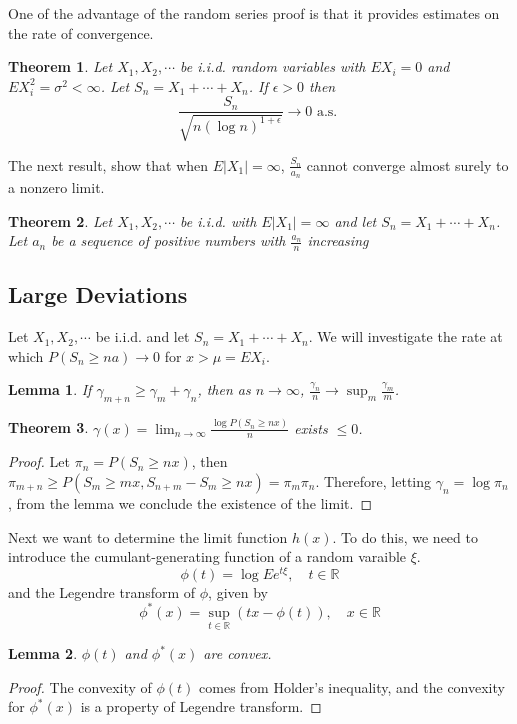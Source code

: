 \documentclass{article}
\newtheorem{Thm}{Theorem}[section]
\newtheorem{Lem}{Lemma}[section]
\theoremstyle{definition}
\begin{document}
One of the advantage of the random series proof is that it provides estimates on the rate of convergence.
\begin{Thm}
    Let $X_1,X_2,\cdots$ be i.i.d. random variables with $EX_i=0$ and $EX_i^2=\sigma^2<\infty$. Let $S_n=X_1+\cdots+X_n$. If $\epsilon>0$ then 
    \[\frac{S_n}{\sqrt{n(\log n)^{1+\epsilon}}}\to 0\text{ a.s. }\]
\end{Thm}

The next result, show that when $E\left|X_1\right|=\infty$, $\frac{S_n}{a_n}$ cannot converge almost surely to a nonzero limit.
\begin{Thm}
    Let $X_1,X_2,\cdots$ be i.i.d. with $E\left|X_1\right|=\infty$ and let $S_n=X_1+\cdots+X_n$.
    Let $a_n$ be a sequence of positive numbers with $\frac{a_n}{n}$ increasing
\end{Thm}

\subsection{Large Deviations}
Let $X_1,X_2,\cdots$ be i.i.d. and let $S_n=X_1+\cdots+X_n$. We will investigate the rate at which $P(S_n\ge na)\to 0$ for $x>\mu=EX_i$.
\begin{Lem}
If $\gamma_{m+n}\ge\gamma_m+\gamma_n$, then as $n\to\infty$, $\frac{\gamma_n}{n}\to\sup_m\frac{\gamma_m}{m}$.
\end{Lem}
\begin{Thm}
$\gamma(x)=\lim_{n\to\infty}\frac{\log P(S_n\ge nx)}{n}$ exists $\le 0$.
\end{Thm}
\begin{proof}
Let $\pi_n=P(S_n\ge nx)$, then $\pi_{m+n}\ge P(S_m\ge mx,S_{n+m}-S_m\ge nx)=\pi_m\pi_n$. Therefore, letting $\gamma_n=\log\pi_n$, from the lemma we conclude the existence of the limit.
\end{proof}

Next we want to determine the limit function $h(x)$. To do this, we need to introduce the cumulant-generating function of a random varaible $\xi$.
\[\phi(t)=\log E e^{t\xi},\quad t\in \mathbb{R}\]
and the Legendre transform of $\phi$, given by 
\[\phi^*(x)=\sup_{t\in \mathbb{R}}(tx-\phi(t)),\quad x\in\mathbb{R}\]
\begin{Lem}
    $\phi(t)$ and $\phi^*(x)$ are convex.
\end{Lem}
\begin{proof}
    The convexity of $\phi(t)$ comes from Holder's inequality, and the convexity for $\phi^*(x)$ is a property of Legendre transform.
\end{proof}
\end{document}
